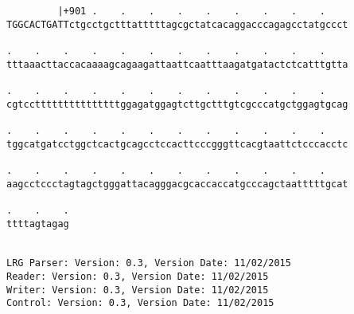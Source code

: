\documentclass{article}
\begin{document}
\begin{Verbatim}
         |+901 .    .    .    .    .    .    .    .    .    
TGGCACTGATTctgcctgctttatttttagcgctatcacaggacccagagcctatgccct
                                                            
.    .    .    .    .    .    .    .    .    .    .    .    
tttaaacttaccacaaaagcagaagattaattcaatttaagatgatactctcatttgtta
                                                            
.    .    .    .    .    .    .    .    .    .    .    .    
cgtcctttttttttttttttggagatggagtcttgctttgtcgcccatgctggagtgcag
                                                            
.    .    .    .    .    .    .    .    .    .    .    .    
tggcatgatcctggctcactgcagcctccacttcccgggttcacgtaattctcccacctc
                                                            
.    .    .    .    .    .    .    .    .    .    .    .    
aagcctccctagtagctgggattacagggacgcaccaccatgcccagctaatttttgcat
                                                            
.    .    .
ttttagtagag
           
           
LRG Parser: Version: 0.3, Version Date: 11/02/2015
Reader: Version: 0.3, Version Date: 11/02/2015
Writer: Version: 0.3, Version Date: 11/02/2015
Control: Version: 0.3, Version Date: 11/02/2015
\end{Verbatim}
\end{document}

